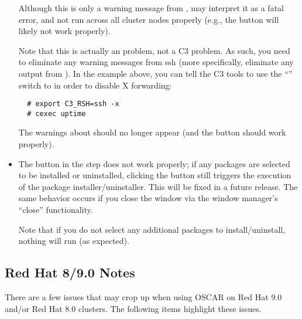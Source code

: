 \begin{itemize}
  Although this is only a warning message from , 
  may interpret it as a fatal error, and not run across all cluster
  nodes properly (e.g., the  button
  will likely not work properly).

  Note that this is actually an  problem, not a C3 problem.
  As such, you need to eliminate any warning messages from ssh (more
  specifically, eliminate any output from ).  In the
  example above, you can tell the C3 tools to use the ``''
  switch to  in order to disable X forwarding:

\begin{verbatim}
  # export C3_RSH=ssh -x
  # cexec uptime
\end{verbatim}
  
  The warnings about  should no longer appear (and the
   button should work properly).
  
\item The  button in the  step does not work properly; if any packages are selected
  to be installed or uninstalled, clicking the  button
  still triggers the execution of the package installer/uninstaller.
  This will be fixed in a future release.  The same behavior occurs if
  you close the window via the window manager's ``close''
  functionality.

  Note that if you do not select any additional packages to
  install/uninstall, nothing will run (as expected).

\endchange

\end{itemize}


\subsection{Red Hat 8/9.0 Notes}
\label{subsec:rh90notes}

There are a few issues that may crop up when using OSCAR on Red Hat 9.0
and/or Red Hat 8.0 clusters.  The following items highlight these
issues.  

